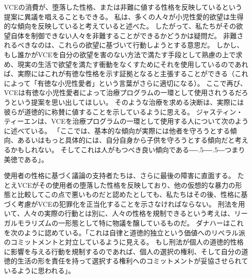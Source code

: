 \documentclass[paper=a4,book,openany]{jlreq}
\def\DDASH{―\kern-.5\zw―\kern-.5\zw―} %
\begin{document}
VCEの消費が、堕落した性格、または非難に値する性格を反映しているという提案に異議を唱えることもできる。
私は、多くの人々が小児性愛的欲望は生得的な傾向を反映していると考えていると述べた。
したがって、私たちがその欲望自体を制御できない人々を非難することができるかどうかは疑問だ。
非難されるべきなのは、これらの欲望に基づいて行動しようとする意思だ。
しかし、もし誰かがVCEを自分の欲望を害のない方法で満たす手段として熟慮の上で求め、現実の生活で欲望を満たす衝動をなくすためにそれを使用しているのであれば、実際にはこれが有徳な性格を示す証拠となると主張することができる（これによって「有徳な小児性愛者」という言葉がさらに適切になる）。
ここで再び、VCEは有徳な小児性愛者によって治療プログラムの一環として使用されうるだろうという提案を思い出してほしい。
そのような治療を求める決断は、実際には彼らが道徳的に称賛に値することを示しているように思える。
ジャスティン・ティーエンは、VCEを治療プログラムの一環として使用する人について次のように述べている。
「ここでは、基本的な傾向が実際には他者を守ろうとする傾向、あるいはもっと具体的には、自分自身から子供を守ろうとする傾向だと考えるかもしれない。
そしてこれは人がもつべき良い傾向である{\DDASH}つまり美徳である」\citep[p.1159]{tiehen18:_virtual_ethic_creep_act}。

使用者の性格に基づく議論の支持者たちは、さらに最後の障害に直面する。
たとえVCEがその使用者の堕落した性格を反映しており、他の仮想的な暴力の形態と比較してこの点で悪いものだと認めたとしても、私たちはその後、性格に基づく考慮がVCEの犯罪化を正当化することを示さなければならない。
刑法を用いて、人々の実際の行動とは別に、人々の性格を規制できるという考えは、リーガルモラリズムの一形態として特に物議を醸しているものだ。
ダナハーはこれを次のように認めている。「これは自律と道徳的独立という価値へのリベラル派のコミットメントと対立しているように見える。
もし刑法が個人の道徳的性格に影響を与える行動を規制するのであれば、個人の選択の権利、そして自分の道徳的生活の形を責任を持って選択する権利へのコミットメントが妥協させられているように思われる」\citep[p.79]{danaher17:_robot_rape_robot_child_sexual_abuse}。
\end{document}
